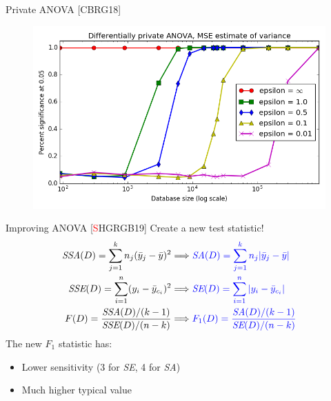\documentclass{beamer}
\newcommand{\sse}{\textit{SSE}\xspace}
\newcommand{\ssa}{\textit{SSA}\xspace}
\newcommand{\se}{\textit{SE}\xspace}
\newcommand{\sa}{\textit{SA}\xspace}
\begin{document}
\begin{frame}{Private ANOVA [CBRG18]}
  \begin{figure}
  \includegraphics[scale=0.5]{images/campbellpower}
  \end{figure}
\end{frame}

\begin{frame}{Improving ANOVA [\textcolor{red}{S}HGRGB19]}
Create a new test statistic! \pause
\begin{align*}
\ssa(D) = \sum_{j=1}^{k} n_j (\bar{y}_j - \bar{y})^2  &\Longrightarrow \textcolor{blue}{ \sa(D) = \sum_{j=1}^{k} n_j |\bar{y}_j - \bar{y}| }\\  
\sse(D) = \sum_{i=1}^{n}  (y_{i}-\bar{y}_{c_i})^2  &\Longrightarrow \textcolor{blue}{\se(D) = \sum_{i=1}^{n}  |y_{i}-\bar{y}_{c_i}| } \\  
F(D) = \frac{\ssa(D)/(k-1)}{\sse(D)/(n-k)} &\Longrightarrow  \textcolor{blue} {F_1(D) = \frac{\sa(D)/(k-1)}{\se(D)/(n-k)}}
\end{align*}
 \pause
The new $F_1$ statistic has: \pause
\begin{itemize}
\item Lower sensitivity (3 for \se, 4 for \sa) \pause
\item Much higher typical value 
\end{itemize}
\end{frame}
\end{document}
